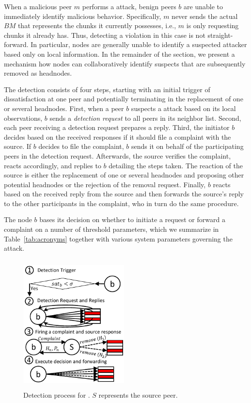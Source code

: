 When a malicious peer $m$ performs a \drop attack, benign peers $b$ are unable to immediately identify malicious behavior.
Specifically, $m$ never sends the actual $BM$ that represents the chunks it currently possesses, i.e., $m$ is only requesting chunks it already has. 
Thus, detecting a violation in this case is not straight-forward. In particular, nodes are generally unable to identify a suspected attacker based only on local information.
In the remainder of the section, we present a mechanism how nodes can collaboratively identify suspects that are subsequently removed as headnodes.  


The detection consists of four steps, starting with an initial trigger of dissatisfaction at one peer and potentially terminating in the replacement of one or several headnodes. 
First, when a peer $b$ suspects a \drop attack based on its local observations, $b$ sends a \emph{detection request} to all peers in its neighbor list.
Second, each peer receiving a detection request prepares a reply. 
Third, the initiator $b$ decides based on the received responses if it should file a complaint with the source.
If $b$ decides to file the complaint, $b$ sends it on behalf of the participating peers in the detection request. 
Afterwards, the source verifies the complaint, reacts accordingly, and replies to $b$ detailing the steps taken. 
The reaction of the source is either the replacement of one or several headnodes and proposing other potential headnodes or the rejection of the removal request.
Finally, $b$ reacts based on the received reply from the source and then forwards the source's reply to the other participants in the complaint, who in turn do the same procedure.

The node $b$ bases its decision on whether to initiate a request or forward a complaint on a number of threshold parameters, which we summarize in Table~\ref{tab:acronyms} together with various system parameters governing the attack. 




\begin{figure}
 \centering
 \includegraphics[width=5.5cm,height=7cm]{./Figures/detection.pdf}
  \caption{Detection process for \drop. $S$ represents the source peer.}
\label{detection-blocks} 
\end{figure}

